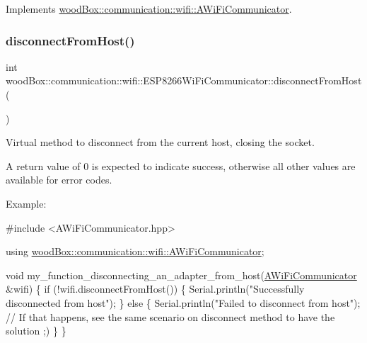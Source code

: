 Implements \mbox{\hyperlink{classwood_box_1_1communication_1_1wifi_1_1_a_wi_fi_communicator_ae0be1e1dd1e0508bdd2f348f0052f6e6}{wood\+Box\+::communication\+::wifi\+::\+A\+Wi\+Fi\+Communicator}}.

\mbox{\label{classwood_box_1_1communication_1_1wifi_1_1_e_s_p8266_wi_fi_communicator_a5a407734df1ae47ac32575fa6346cfd4}} 
\subsubsection{\texorpdfstring{disconnect\+From\+Host()}{disconnectFromHost()}}
{\footnotesize\ttfamily int wood\+Box\+::communication\+::wifi\+::\+E\+S\+P8266\+Wi\+Fi\+Communicator\+::disconnect\+From\+Host (\begin{DoxyParamCaption}{ }\end{DoxyParamCaption})\hspace{0.3cm}{\ttfamily [virtual]}}

Virtual method to disconnect from the current host, closing the socket.

A return value of 0 is expected to indicate success, otherwise all other values are available for error codes.

Example\+:


\begin{DoxyCode}
\textcolor{preprocessor}{#include <AWiFiCommunicator.hpp>}

\textcolor{keyword}{using} \mbox{\hyperlink{classwood_box_1_1communication_1_1wifi_1_1_a_wi_fi_communicator}{woodBox::communication::wifi::AWiFiCommunicator}};

\textcolor{keywordtype}{void} my\_function\_disconnecting\_an\_adapter\_from\_host(\mbox{\hyperlink{classwood_box_1_1communication_1_1wifi_1_1_a_wi_fi_communicator_a9d1dc13ca9243170b04211bef2b86ed2}{AWiFiCommunicator}} &wifi) \{
  \textcolor{keywordflow}{if} (!wifi.disconnectFromHost()) \{
    Serial.println(\textcolor{stringliteral}{"Successfully disconnected from host"});
  \} \textcolor{keywordflow}{else} \{
    Serial.println(\textcolor{stringliteral}{"Failed to disconnect from host"}); \textcolor{comment}{// If that happens, see the same scenario on
       disconnect method to have the solution ;)}
  \}
\}
\end{DoxyCode}
 

